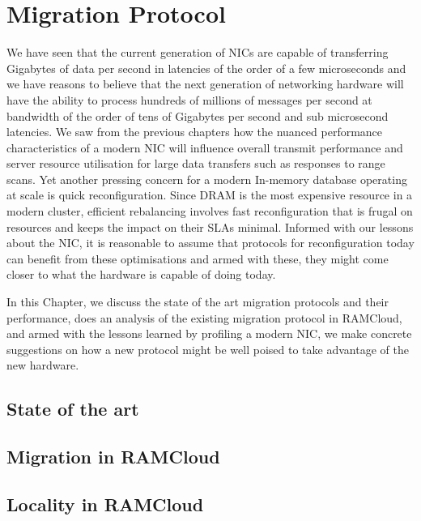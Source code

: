 
\chapter{Migration Protocol}
We have seen that the current generation of NICs are capable of transferring Gigabytes of 
data per second in latencies of the order of a few microseconds and we have reasons to believe 
that the next generation of networking hardware will have the ability to process 
hundreds of millions of messages per second at bandwidth of the order of tens of Gigabytes per 
second and sub microsecond latencies\cite{cx6}.
We saw from the previous chapters how the nuanced performance characteristics of 
a modern NIC will influence overall transmit performance and server resource utilisation 
for large data transfers such as responses to range scans. Yet another pressing 
concern for a modern In-memory database operating at scale is quick reconfiguration. 
Since DRAM is the most expensive resource in a modern cluster, efficient rebalancing 
involves fast reconfiguration that is frugal on resources and keeps the impact on their 
SLAs minimal.
Informed with our lessons about the NIC, it is reasonable to assume that protocols for reconfiguration 
today can benefit from these optimisations and armed with these, they might come 
closer to what the hardware is capable of doing today.

In this Chapter, we discuss the state of the art migration protocols and their 
performance, does an analysis of the existing migration protocol in RAMCloud, 
and armed with the lessons learned by profiling a modern NIC, we make concrete 
suggestions on how a new protocol might be well poised to take advantage of the 
new hardware.


\section{State of the art}

\section{Migration in RAMCloud}

\section{Locality in RAMCloud}



